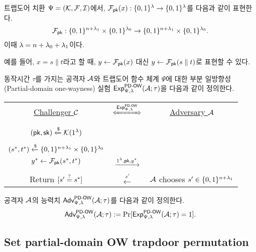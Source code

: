 트랩도어 치환 $\Psi = (\mathcal{K}, \mathcal{F}, \mathcal{I})$에서, $\mathcal{F}_{\textsf{pk}}(x):\{0, 1\}^{\lambda} \to
\{0, 1\}^{\lambda}$를 다음과 같이 표현한다.
$$
	\mathcal{F}_{\textsf{pk}}: \{0, 1\}^{n + \lambda_1} \times \{0, 1\}^{\lambda_0} \to \{0, 1\}^{n + \lambda_1} \times \{0, 1\}^{\lambda_0}.
$$
이때 $\lambda = n + \lambda_0 + \lambda_1$이다. 
\begin{memo}
	예를 들어, $x = s \parallel t$라고 할 때, $y \gets \mathcal{F}_{\textsf{pk}}(x)$ 대신 $y
	\gets \mathcal{F}_{\textsf{pk}}(s \parallel t)$로 표현할 수 있다.
\end{memo}
동작시간 $\tau$를 가지는 공격자 $\mathcal{A}$와 트랩도어 함수 체계 $\Psi$에 대한 부분
일방향성(Partial-domain one-wayness) 실험 $\textsf{Exp}^{\textsf{PD-OW}}_{\Psi, \lambda}(\mathcal{A};
\tau)$을 다음과 같이 정의한다.

\begin{tcolorbox}[colback=white]
	\centering
	\begin{tabularx}{\linewidth}{CcC}
		\underline{Challenger $\mathcal{C}$} & $\xLeftrightarrow{\EXP^{\PDOW}_{\Psi, \lm}}$ & \underline{Adversary $\mathcal{A}$} \\
		\\
		$(\textsf{pk}, \textsf{sk}) \xleftarrow{\$} \mathcal{K}(1^{\lambda})$ & & \\
		\\
		$(s^*, t^*) \xleftarrow{\$} \{0, 1\}^{n + \lambda_1} \times \{0, 1\}^{\lambda_0}$ \\ $y^* \gets \mathcal{F}_{\textsf{pk}}(s^*, t^*)$ & $\xrightarrow{1^{\lambda}, \textsf{pk}, y^*}$ & \\
		\\
		Return $[s' \overset{?}{=} s^*]$ & $\xleftarrow{s'}$ & $\mathcal{A}$ chooses $s' \in \{0, 1\}^{n + \lambda_1}$ \\
  \end{tabularx}
\end{tcolorbox}

공격자 $\mathcal{A}$의 능력치 $\textsf{Adv}^{\textsf{PD-OW}}_{\Psi, \lambda}(\mathcal{A}; \tau)$를 다음과 같이 정의한다.
$$
	\textsf{Adv}^{\textsf{PD-OW}}_{\Psi, \lambda}(\mathcal{A}; \tau) := \Pr[\textsf{Exp}^{\textsf{PD-OW}}_{\Psi, \lambda}(\mathcal{A}; \tau) = 1].
$$

\subsection{Set partial-domain OW trapdoor permutation}

